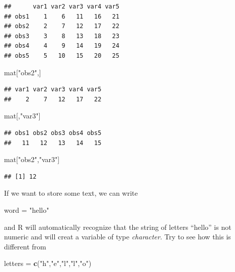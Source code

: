 \documentclass[]{article}
\newenvironment{Shaded}{\begin{snugshade}}{\end{snugshade}}
\newcommand{\KeywordTok}[1]{\textcolor[rgb]{0.13,0.29,0.53}{\textbf{#1}}}
\newcommand{\NormalTok}[1]{#1}
\newcommand{\StringTok}[1]{\textcolor[rgb]{0.31,0.60,0.02}{#1}}
\begin{document}
\begin{verbatim}
##      var1 var2 var3 var4 var5
## obs1    1    6   11   16   21
## obs2    2    7   12   17   22
## obs3    3    8   13   18   23
## obs4    4    9   14   19   24
## obs5    5   10   15   20   25
\end{verbatim}

\begin{Shaded}
\begin{Highlighting}[]
\NormalTok{mat[}\StringTok{"obs2"}\NormalTok{,]}
\end{Highlighting}
\end{Shaded}

\begin{verbatim}
## var1 var2 var3 var4 var5 
##    2    7   12   17   22
\end{verbatim}

\begin{Shaded}
\begin{Highlighting}[]
\NormalTok{mat[,}\StringTok{"var3"}\NormalTok{]}
\end{Highlighting}
\end{Shaded}

\begin{verbatim}
## obs1 obs2 obs3 obs4 obs5 
##   11   12   13   14   15
\end{verbatim}

\begin{Shaded}
\begin{Highlighting}[]
\NormalTok{mat[}\StringTok{"obs2"}\NormalTok{,}\StringTok{"var3"}\NormalTok{]}
\end{Highlighting}
\end{Shaded}

\begin{verbatim}
## [1] 12
\end{verbatim}

If we want to store some text, we can write

\begin{Shaded}
\begin{Highlighting}[]
\NormalTok{word =}\StringTok{ "hello"}
\end{Highlighting}
\end{Shaded}

and R will automatically recognize that the string of letters ``hello''
is not numeric and will creat a variable of type \emph{character}. Try
to see how this is different from

\begin{Shaded}
\begin{Highlighting}[]
\NormalTok{letters =}\StringTok{ }\KeywordTok{c}\NormalTok{(}\StringTok{"h"}\NormalTok{,}\StringTok{"e"}\NormalTok{,}\StringTok{"l"}\NormalTok{,}\StringTok{"l"}\NormalTok{,}\StringTok{"o"}\NormalTok{)}
\end{Highlighting}
\end{Shaded}
\end{document}
